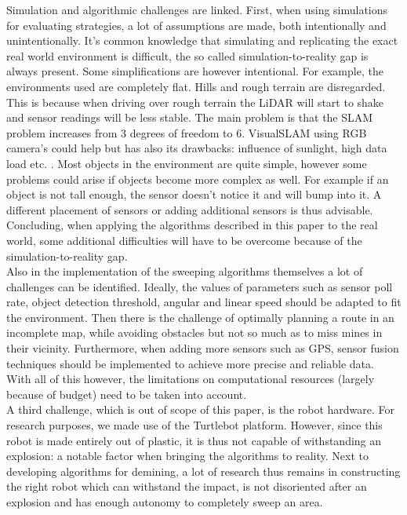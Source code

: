 \documentclass[conference]{IEEEtran}
\begin{document}
Simulation and algorithmic challenges are linked. First, when using simulations for evaluating strategies, a lot of assumptions are made, both intentionally and unintentionally. It's common knowledge that simulating and replicating the exact real world environment is difficult, the so called simulation-to-reality gap is always present. Some simplifications are however intentional. For example, the environments used are completely flat. Hills and rough terrain are disregarded. This is because when driving over rough terrain the LiDAR will start to shake and sensor readings will be less stable. The main problem is that the SLAM problem increases from 3 degrees of freedom to 6. VisualSLAM using RGB camera's could help but has also its drawbacks: influence of sunlight, high data load etc. \cite{Daems2020}. Most objects in the environment are quite simple, however some problems could arise if objects become more complex as well. For example if an object is not tall enough, the sensor doesn't notice it and will bump into it. A different placement of sensors or adding additional sensors is thus advisable. Concluding, when applying the algorithms described in this paper to the real world, some additional difficulties will have to be overcome because of the simulation-to-reality gap. \\

Also in the implementation of the sweeping algorithms themselves a lot of challenges can be identified. Ideally, the values of parameters such as sensor poll rate, object detection threshold, angular and linear speed should be adapted to fit the environment. Then there is the challenge of optimally planning a route in an incomplete map, while avoiding obstacles but not so much as to miss mines in their vicinity. Furthermore, when adding more sensors such as GPS, sensor fusion techniques should be implemented to achieve more precise and reliable data. With all of this however, the limitations on computational resources (largely because of budget) need to be taken into account.\\

A third challenge, which is out of scope of this paper, is the robot hardware. For research purposes, we made use of the Turtlebot platform. However, since this robot is made entirely out of plastic, it is thus not capable of withstanding an explosion: a notable factor when bringing the algorithms to reality. Next to developing algorithms for demining, a lot of research thus remains in constructing the right robot which can withstand the impact, is not disoriented after an explosion and has enough autonomy to completely sweep an area.
\end{document}
